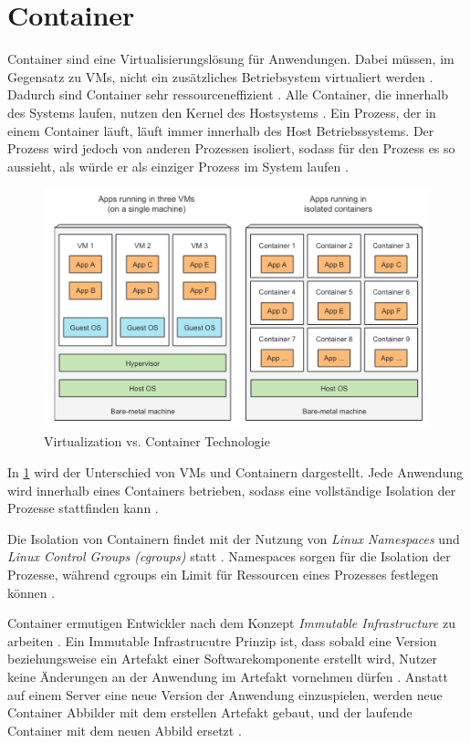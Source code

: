 \section{Container}
\label{sec:grundlagen:container}
Container sind eine Virtualisierungslösung für Anwendungen.
Dabei müssen, im Gegensatz zu \acfp{VM}, nicht ein zusätzliches Betriebsystem virtualiert werden \cite{Marko2018}.
Dadurch sind Container sehr ressourceneffizient \cite{Kane2018}.
Alle Container, die innerhalb des Systems laufen, nutzen den Kernel des Hostsystems \cite{Marko2018}.
Ein Prozess, der in einem Container läuft, läuft immer innerhalb des Host Betriebssystems.
Der Prozess wird jedoch von anderen Prozessen isoliert, sodass für den Prozess es so aussieht, als würde er
als einziger Prozess im System laufen \cite{Marko2018}.

\begin{figure}
  \includegraphics[width=\textwidth]{gfx/chapters/2_grundlagen/container-vs-vm.png}
  \caption{Virtualization vs. Container Technologie}
  \label{fig:container:vergleich}
\end{figure}

In \ref{fig:container:vergleich} wird der Unterschied von \acp{VM} und Containern dargestellt. 
Jede Anwendung wird innerhalb eines Containers betrieben, sodass eine vollständige Isolation der Prozesse
stattfinden kann \cite{Marko2018}.

Die Isolation von Containern findet mit der Nutzung von \emph{Linux Namespaces} und \emph{Linux Control Groups (cgroups)} statt \cite{Marko2018}.
Namespaces sorgen für die Isolation der Prozesse, 
während cgroups ein Limit für Ressourcen eines Prozesses festlegen können \cite{Marko2018}.

Container ermutigen Entwickler nach dem Konzept \emph{Immutable Infrastructure} zu arbeiten \cite{Burns2019}.
Ein Immutable Infrastrucutre Prinzip ist, dass sobald eine Version beziehungsweise ein Artefakt einer Softwarekomponente erstellt wird,
Nutzer keine Änderungen an der Anwendung im Artefakt vornehmen dürfen \cite{Burns2019}. 
Anstatt auf einem Server eine neue Version der Anwendung einzuspielen, werden neue Container Abbilder mit dem erstellen Artefakt gebaut, 
und der laufende Container mit dem neuen Abbild ersetzt \cite{Burns2019}.

